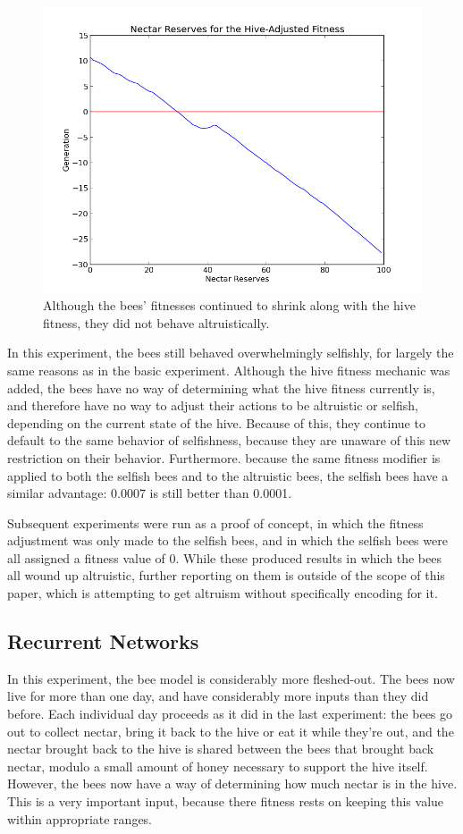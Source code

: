 \documentclass[twoside]{article}
\begin{document}
\begin{multicols}{2}
			\begin{figure}[H]
				\begin{center}
					\includegraphics[width=.5\textwidth]{results/hive_fitness_res.png}
				\end{center}
				\caption{Although the bees' fitnesses continued to shrink along with the hive fitness, they did not behave altruistically.}
				\label{fig:hive_fitness_reserves}
			\end{figure}

			In this experiment, the bees still behaved overwhelmingly selfishly, for largely the same reasons as in the basic experiment. Although the hive fitness mechanic was added, the bees have no way of determining what the hive fitness currently is, and therefore have no way to adjust their actions to be altruistic or selfish, depending on the current state of the hive. Because of this, they continue to default to the same behavior of selfishness, because they are unaware of this new restriction on their behavior. Furthermore. because the same fitness modifier is applied to both the selfish bees and to the altruistic bees, the selfish bees have a similar advantage: 0.0007 is still better than 0.0001.

			Subsequent experiments were run as a proof of concept, in which the fitness adjustment was only made to the selfish bees, and in which the selfish bees were all assigned a fitness value of 0. While these produced results in which the bees all wound up altruistic, further reporting on them is outside of the scope of this paper, which is attempting to get altruism without specifically encoding for it.

		\subsection{Recurrent Networks} %
			\label{sub:recurrent_networks}


			In this experiment, the bee model is considerably more fleshed-out. The bees now live for more than one day, and have considerably more inputs than they did before. Each individual day proceeds as it did in the last experiment: the bees go out to collect nectar, bring it back to the hive or eat it while they're out, and the nectar brought back to the hive is shared between the bees that brought back nectar, modulo a small amount of honey necessary to support the hive itself. However, the bees now have a way of determining how much nectar is in the hive. This is a very important input, because there fitness rests on keeping this value within appropriate ranges. 


\end{multicols}
\end{document}
